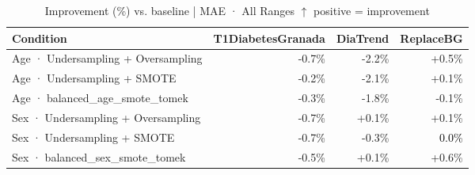 \begin{table}[htbp]
\centering
\small
\caption{Improvement (\%) vs. baseline  |  MAE · All Ranges  $\uparrow$ positive = improvement}
\label{tab:delta_mae_entire_family_size_same_size}
\begin{tabular}{lrrr}
\toprule
\textbf{Condition} & \textbf{T1DiabetesGranada} & \textbf{DiaTrend} & \textbf{ReplaceBG} \\
\midrule
Age · Undersampling + Oversampling & \textcolor{BrickRed}{-0.7\%} & \textcolor{BrickRed}{-2.2\%} & \textcolor{OliveGreen}{+0.5\%} \\
Age · Undersampling + SMOTE & \textcolor{BrickRed}{-0.2\%} & \textcolor{BrickRed}{-2.1\%} & \textcolor{OliveGreen}{+0.1\%} \\
Age · balanced_age_smote_tomek & \textcolor{BrickRed}{-0.3\%} & \textcolor{BrickRed}{-1.8\%} & \textcolor{BrickRed}{-0.1\%} \\
\midrule
Sex · Undersampling + Oversampling & \textcolor{BrickRed}{-0.7\%} & \textcolor{OliveGreen}{+0.1\%} & \textcolor{OliveGreen}{+0.1\%} \\
Sex · Undersampling + SMOTE & \textcolor{BrickRed}{-0.7\%} & \textcolor{BrickRed}{-0.3\%} & \textcolor{black}{0.0\%} \\
Sex · balanced_sex_smote_tomek & \textcolor{BrickRed}{-0.5\%} & \textcolor{OliveGreen}{+0.1\%} & \textcolor{OliveGreen}{+0.6\%} \\
\bottomrule
\end{tabular}
\end{table}